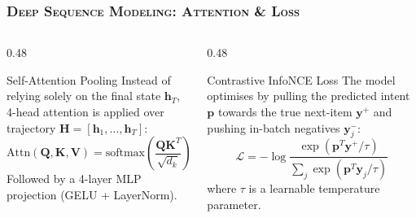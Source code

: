 \documentclass[aspectratio=169,10pt]{beamer}
\begin{document}
\begin{frame}
  \frametitle{\textsc{Deep Sequence Modeling: Attention \& Loss}}

  \begin{columns}[T]
    \begin{column}{0.48\textwidth}
      \begin{exampleblock}{Self-Attention Pooling}
        \fontsize{7.5pt}{9.5pt}\selectfont
        Instead of relying solely on the final state $\mathbf{h}_T$, 4-head attention is applied over trajectory $\mathbf{H} = [\mathbf{h}_1, \dots, \mathbf{h}_T]$:
        \begin{equation}
            \text{Attn}(\mathbf{Q}, \mathbf{K}, \mathbf{V}) = \text{softmax}\left(\frac{\mathbf{Q}\mathbf{K}^T}{\sqrt{d_k}}\right)\mathbf{V}
        \end{equation}
        Followed by a 4-layer MLP projection (GELU + LayerNorm).
      \end{exampleblock}
    \end{column}
    \begin{column}{0.48\textwidth}
      \begin{block}{Contrastive InfoNCE Loss}
        \fontsize{7.5pt}{9.5pt}\selectfont
        The model optimises by pulling the predicted intent $\mathbf{p}$ towards the true next-item $\mathbf{y}^+$ and pushing in-batch negatives $\mathbf{y}^-_j$:
        \begin{equation}
            \mathcal{L} = -\log \frac{\exp(\mathbf{p}^T \mathbf{y}^+ / \tau)}{\sum_{j} \exp(\mathbf{p}^T \mathbf{y}_j / \tau)}
        \end{equation}
        where $\tau$ is a learnable temperature parameter.
      \end{block}
    \end{column}
  \end{columns}
\end{frame}

\end{document}
